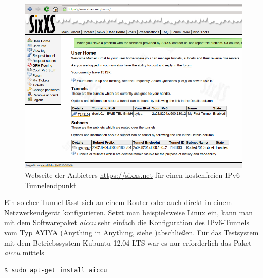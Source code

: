\documentclass[a4paper,12pt]{scrartcl}
\begin{document}
\begin{figure}[htb]
\begin{center}
 \includegraphics[width=1\hsize]{./images/sixxs.png}
 \end{center}
\caption[Webseite der Anbieters \url{https://sixxs.net} f\"ur einen kostenfreien IPv6-Tunnelendpunkt]{\label{sixxs}Webseite der Anbieters \url{https://sixxs.net} f\"ur einen kostenfreien IPv6-Tunnelendpunkt}
\end{figure}

Ein solcher Tunnel l\"asst sich an einem Router oder auch direkt in einem Netzwerkendger\"at konfigurieren. Setzt man beispielsweise Linux ein, kann man mit dem Softwarepaket \textit{aiccu} sehr einfach die Konfiguration des IPv6-Tunnels vom Typ AYIYA (Anything in Anything, siehe\cite[sixxsayiya]{sixxsayiya} )abschlie{\ss}en. F\"ur das Testsystem mit dem Betriebssystem Kubuntu 12.04 LTS war es nur erforderlich das Paket \textit{aiccu} mittels 

\begin{lstlisting}
$ sudo apt-get install aiccu
\end{lstlisting}
\end{document}
